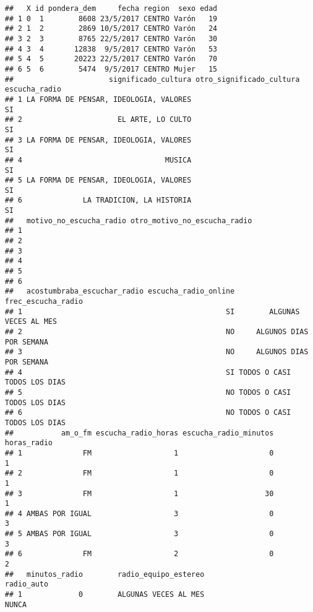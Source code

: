\documentclass[
]{article}
\begin{document}
\begin{verbatim}
##   X id pondera_dem     fecha region  sexo edad
## 1 0  1        8608 23/5/2017 CENTRO Varón   19
## 2 1  2        2869 10/5/2017 CENTRO Varón   24
## 3 2  3        8765 22/5/2017 CENTRO Varón   30
## 4 3  4       12838  9/5/2017 CENTRO Varón   53
## 5 4  5       20223 22/5/2017 CENTRO Varón   70
## 6 5  6        5474  9/5/2017 CENTRO Mujer   15
##                      significado_cultura otro_significado_cultura escucha_radio
## 1 LA FORMA DE PENSAR, IDEOLOGIA, VALORES                                     SI
## 2                      EL ARTE, LO CULTO                                     SI
## 3 LA FORMA DE PENSAR, IDEOLOGIA, VALORES                                     SI
## 4                                 MUSICA                                     SI
## 5 LA FORMA DE PENSAR, IDEOLOGIA, VALORES                                     SI
## 6              LA TRADICION, LA HISTORIA                                     SI
##   motivo_no_escucha_radio otro_motivo_no_escucha_radio
## 1                                                     
## 2                                                     
## 3                                                     
## 4                                                     
## 5                                                     
## 6                                                     
##   acostumbraba_escuchar_radio escucha_radio_online          frec_escucha_radio
## 1                                               SI        ALGUNAS VECES AL MES
## 2                                               NO     ALGUNOS DIAS POR SEMANA
## 3                                               NO     ALGUNOS DIAS POR SEMANA
## 4                                               SI TODOS O CASI TODOS LOS DIAS
## 5                                               NO TODOS O CASI TODOS LOS DIAS
## 6                                               NO TODOS O CASI TODOS LOS DIAS
##           am_o_fm escucha_radio_horas escucha_radio_minutos horas_radio
## 1              FM                   1                     0           1
## 2              FM                   1                     0           1
## 3              FM                   1                    30           1
## 4 AMBAS POR IGUAL                   3                     0           3
## 5 AMBAS POR IGUAL                   3                     0           3
## 6              FM                   2                     0           2
##   minutos_radio        radio_equipo_estereo                  radio_auto
## 1             0        ALGUNAS VECES AL MES                       NUNCA

\end{verbatim}
\end{document}
